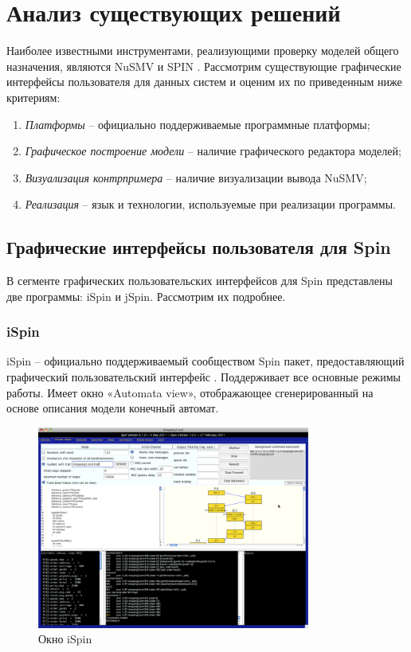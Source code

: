 \chapter{Анализ существующих решений}

Наиболее известными инструментами, реализующими проверку моделей общего назначения, являются NuSMV и SPIN \cite{karpov-book}. Рассмотрим существующие графические интерфейсы пользователя для данных систем и оценим их по приведенным ниже критериям:

\begin{enumerate}
	\item \textit{Платформы} -- официально поддерживаемые программные платформы;
	\item \textit{Графическое построение модели} -- наличие графического редактора моделей;
	\item \textit{Визуализация контрпримера} -- наличие визуализации вывода NuSMV;
	\item \textit{Реализация} -- язык и технологии, используемые при реализации программы.
\end{enumerate}

\section{Графические интерфейсы пользователя для Spin}
	
В сегменте графических пользовательских интерфейсов для Spin представлены две программы: iSpin и jSpin. Рассмотрим их подробнее.

\subsection{iSpin}

iSpin – официально поддерживаемый сообществом Spin пакет, предоставляющий графический пользовательский интерфейс \cite{spin}. Поддерживает все основные режимы работы. Имеет окно «Automata view», отображающее сгенерированный на основе описания модели конечный автомат. 

\begin{figure}[htbp]
	\centering
	\includegraphics[width=0.8\textwidth]{fig/ispin.png}
	\caption{Окно iSpin}
	\label{fig:ispin}
\end{figure}

